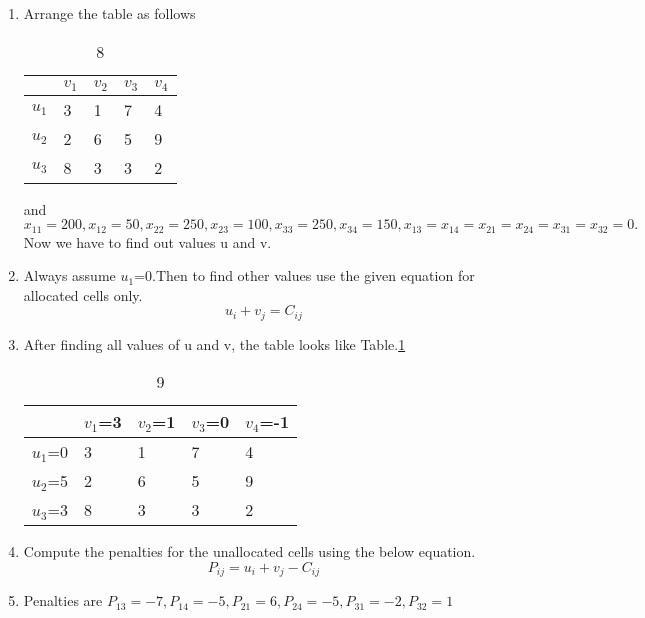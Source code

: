 \documentclass[journal,12pt,twocolumn]{IEEEtran}
\begin{document}
\begin{enumerate}[1.]
\item
Arrange the table as follows
\begin{table}[!h]
\begin{center}
\begin{tabular}{| l | l | l | l | l | }
                 \hline
                   & $v_1$ & $v_2$ & $v_3$ & $v_4$ \\
\hline
$u_1$ & 3 & 1 & 7 & 4  \\ \hline
$u_2$ & 2 & 6 & 5 & 9   \\ \hline
$u_3$ & 8 & 3 & 3 & 2  \\ \hline

\end{tabular}
\end{center}
\caption{8}
\end{table}

and $x_{11}=200,x_{12}=50,x_{22}=250,x_{23}=100,x_{33}=250,x_{34}=150,
x_{13}=x_{14}=x_{21}=x_{24}=x_{31}=x_{32}=0.$
Now we have to find out values u and v.
\item
Always assume $u_1$=0.Then to find other values use the given equation for allocated cells only.
\begin{equation}
u_i+v_j=C_{ij}
\end{equation}
\item After finding all values of u and v, the table looks like Table.\ref{table9}
\begin{table}[!h]
\begin{center}
\begin{tabular}{| l | l | l | l | l | }
                 \hline
                   & $v_1$=3 & $v_2$=1 & $v_3$=0 & $v_4$=-1  \\
\hline
$u_1$=0 & 3 & 1 & 7 & 4  \\ \hline
$u_2$=5 & 2 & 6 & 5 & 9   \\ \hline
$u_3$=3 & 8 & 3 & 3 & 2  \\ \hline

\end{tabular}
\end{center}
\caption{9}
\label{table9}
\end{table}

\item 
Compute the penalties for the unallocated cells using the below equation.
\begin{equation}
P_{ij}=u_i+v_j-C_{ij}
\end{equation}
\label{penalty}
\item Penalties are
$
P_{13}=-7,
P_{14}=-5,
P_{21}=6,
P_{24}=-5,
P_{31}=-2,
P_{32}=1
$


\end{enumerate}
\end{document}
